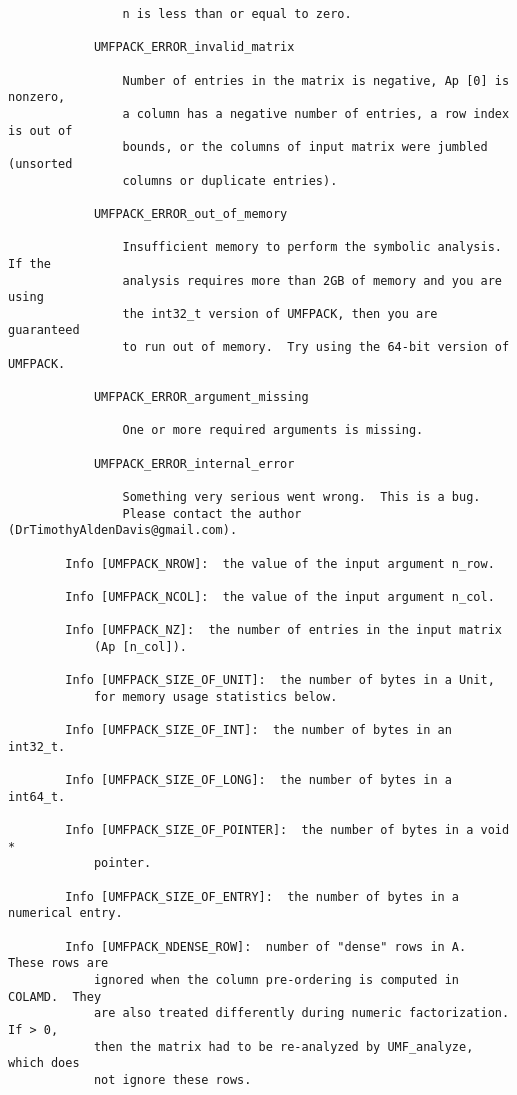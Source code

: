 \documentclass[11pt]{article}
\begin{document}
{\begin{verbatim}
                n is less than or equal to zero.

            UMFPACK_ERROR_invalid_matrix

                Number of entries in the matrix is negative, Ap [0] is nonzero,
                a column has a negative number of entries, a row index is out of
                bounds, or the columns of input matrix were jumbled (unsorted
                columns or duplicate entries).

            UMFPACK_ERROR_out_of_memory

                Insufficient memory to perform the symbolic analysis.  If the
                analysis requires more than 2GB of memory and you are using
                the int32_t version of UMFPACK, then you are guaranteed
                to run out of memory.  Try using the 64-bit version of UMFPACK.

            UMFPACK_ERROR_argument_missing

                One or more required arguments is missing.

            UMFPACK_ERROR_internal_error

                Something very serious went wrong.  This is a bug.
                Please contact the author (DrTimothyAldenDavis@gmail.com).

        Info [UMFPACK_NROW]:  the value of the input argument n_row.

        Info [UMFPACK_NCOL]:  the value of the input argument n_col.

        Info [UMFPACK_NZ]:  the number of entries in the input matrix
            (Ap [n_col]).

        Info [UMFPACK_SIZE_OF_UNIT]:  the number of bytes in a Unit,
            for memory usage statistics below.

        Info [UMFPACK_SIZE_OF_INT]:  the number of bytes in an int32_t.

        Info [UMFPACK_SIZE_OF_LONG]:  the number of bytes in a int64_t.

        Info [UMFPACK_SIZE_OF_POINTER]:  the number of bytes in a void *
            pointer.

        Info [UMFPACK_SIZE_OF_ENTRY]:  the number of bytes in a numerical entry.

        Info [UMFPACK_NDENSE_ROW]:  number of "dense" rows in A.  These rows are
            ignored when the column pre-ordering is computed in COLAMD.  They
            are also treated differently during numeric factorization.  If > 0,
            then the matrix had to be re-analyzed by UMF_analyze, which does
            not ignore these rows.


\end{verbatim}}
\end{document}
